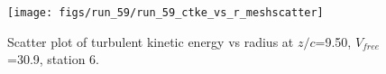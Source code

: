 \begin{figure}[H]
\centering
\texttt{[image: figs/run\_59/run\_59\_ctke\_vs\_r\_meshscatter]}
\caption{Scatter plot of turbulent kinetic energy vs radius at $z/c$=9.50, $V_{free}$=30.9, station 6.}
\label{fig:run_59_ctke_vs_r_meshscatter}
\end{figure}


